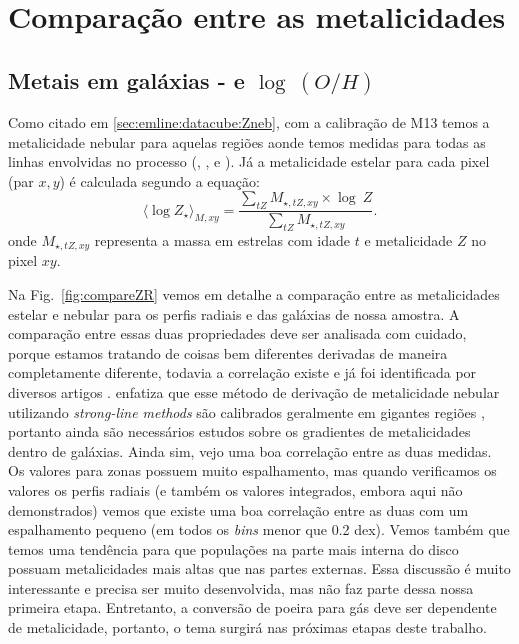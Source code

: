
\section{Comparação entre as metalicidades}
\label{apendice:synvsneb:Z}

\subsection{Metais em galáxias -  e $\log\ (O/H)$}
\label{apendice:synvsneb:ZemuZR}

Como citado em \ref{sec:emline:datacube:Zneb}, com a calibração de M13 temos a metalicidade nebular
para aquelas regiões aonde temos medidas para todas as linhas envolvidas no processo (\Hbeta, \oIII,
\Halpha e \nII). Já a metalicidade estelar para cada pixel (par $x,y$) é calculada segundo a
equação:
\begin{equation}
 	\label{eq:logZmass}
 	\langle \log Z_\star \rangle_{M,xy} =
	\frac{ \sum_{tZ} M_{\star,tZ,xy} \times \log\ Z}{
	\sum_{tZ} M_{\star,tZ,xy} }.
\end{equation}
\noindent onde $M_{\star,tZ,xy}$ representa a massa em estrelas com idade $t$ e metalicidade $Z$ no
pixel $xy$.

Na Fig.\ \ref{fig:compareZR} vemos em detalhe a comparação entre as metalicidades estelar e nebular
para os perfis radiais e das galáxias de nossa amostra. A comparação entre essas duas propriedades
deve ser analisada com cuidado, porque estamos tratando de coisas bem diferentes derivadas de
maneira completamente diferente, todavia a correlação existe e já foi identificada por diversos
artigos \citep{CidFernandes.etal.2005a, Gallazzi.etal.2005a, CidFernandes.etal.2007a,
Asari.etal.2007a}. \citet{Stasinska.etal.2006a} enfatiza que esse método de derivação de
metalicidade nebular utilizando {\em strong-line methods} são calibrados geralmente em gigantes
regiões \Hii, portanto ainda são necessários estudos sobre os gradientes de metalicidades dentro de
galáxias. Ainda sim, vejo uma boa correlação entre as duas medidas. Os valores para zonas possuem
muito espalhamento, mas quando verificamos os valores os perfis radiais (e também os valores
integrados, embora aqui não demonstrados) vemos que existe uma boa correlação entre as duas com um
espalhamento pequeno (em todos os {\em bins} menor que 0.2 dex). Vemos também que temos uma
tendência para que populações na parte mais interna do disco possuam metalicidades mais altas que
nas partes externas. Essa discussão é muito interessante e precisa ser muito desenvolvida, mas não
faz parte dessa nossa primeira etapa. Entretanto, a conversão de poeira para gás deve ser dependente
de metalicidade, portanto, o tema surgirá nas próximas etapas deste trabalho.

